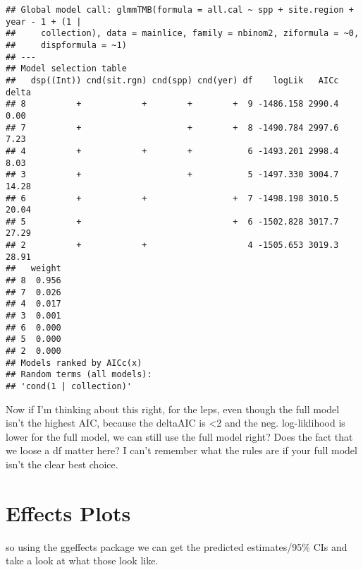 \documentclass[]{article}
\begin{document}
\begin{verbatim}
## Global model call: glmmTMB(formula = all.cal ~ spp + site.region + year - 1 + (1 | 
##     collection), data = mainlice, family = nbinom2, ziformula = ~0, 
##     dispformula = ~1)
## ---
## Model selection table 
##   dsp((Int)) cnd(sit.rgn) cnd(spp) cnd(yer) df    logLik   AICc delta
## 8          +            +        +        +  9 -1486.158 2990.4  0.00
## 7          +                     +        +  8 -1490.784 2997.6  7.23
## 4          +            +        +           6 -1493.201 2998.4  8.03
## 3          +                     +           5 -1497.330 3004.7 14.28
## 6          +            +                 +  7 -1498.198 3010.5 20.04
## 5          +                              +  6 -1502.828 3017.7 27.29
## 2          +            +                    4 -1505.653 3019.3 28.91
##   weight
## 8  0.956
## 7  0.026
## 4  0.017
## 3  0.001
## 6  0.000
## 5  0.000
## 2  0.000
## Models ranked by AICc(x) 
## Random terms (all models): 
## 'cond(1 | collection)'
\end{verbatim}

Now if I'm thinking about this right, for the leps, even though the full
model isn't the highest AIC, because the deltaAIC is \textless{}2 and
the neg. log-liklihood is lower for the full model, we can still use the
full model right? Does the fact that we loose a df matter here? I can't
remember what the rules are if your full model isn't the clear best
choice.

\section{Effects Plots}\label{effects-plots}

so using the ggeffects package we can get the predicted estimates/95\%
CIs and take a look at what those look like.
\end{document}
